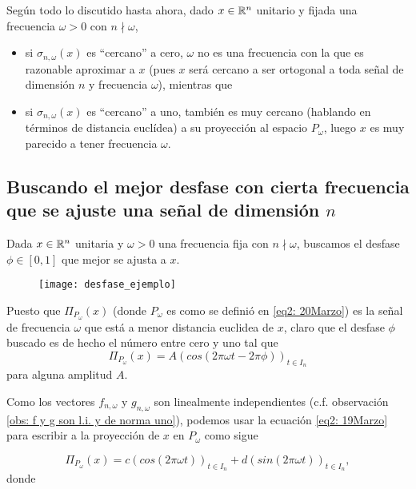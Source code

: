 Según todo lo discutido hasta ahora, dado $x \in \mathbb{R}^{n}$ unitario
y fijada una frecuencia $\omega >0$ con $n \nmid \omega$,
\begin{itemize}
\item si $\sigma_{n, \omega}(x)$ es ``cercano'' a cero, $\omega$ no
es una frecuencia con la que es razonable aproximar a $x$ (pues $x$ será
cercano a ser ortogonal a toda señal de dimensión $n$ y frecuencia 
$\omega$),  mientras que

\item si $\sigma_{n, \omega}(x)$ es ``cercano'' a uno, también es muy cercano
(hablando en términos de distancia euclídea) a su proyección al espacio
$P_{\omega}$, luego $x$ es muy parecido a tener frecuencia $\omega$.
\end{itemize}


\subsection{Buscando el mejor desfase con cierta frecuencia que se ajuste una señal de dimensión $n$}

Dada $x \in \mathbb{R}^{n}$ unitaria y $\omega > 0$ una frecuencia fija
con $n \nmid \omega$, 
buscamos el desfase $\phi \in [0,1]$ que mejor se ajusta a $x$.

\begin{figure}[H]
	\centering
	\texttt{[image: desfase\_ejemplo]} 
\end{figure}	


Puesto que
$\Pi_{P_{\omega}}(x)$ (donde $P_{\omega}$ es como se definió en 
\eqref{eq2: 20Marzo}) es la señal de frecuencia $\omega$ que está a menor
distancia euclidea de $x$, claro que el desfase $\phi$ buscado es de hecho
el número entre cero y uno tal que 
\[
\Pi_{P_{\omega}}(x) = A (cos(2 \pi \omega t -  2 \pi \phi ))_{t \in I_{n}}
\]
para alguna amplitud $A$.


Como los vectores $f_{n, \omega}$ y $g_{n, \omega}$ 
son linealmente independientes (c.f. observación
\ref{obs: f y g son l.i. y de norma uno}),
podemos usar la ecuación \eqref{eq2: 19Marzo}
para escribir a la proyección de $x$ en $P_{\omega}$ como sigue

\begin{equation}
\label{eq3: 20Marzo}
\Pi_{P_{\omega}}(x)= c (cos (2 \pi \omega t))_{t \in I_{n}} + d 
(sin (2 \pi \omega t))_{t \in I_{n}},
\end{equation}
donde


